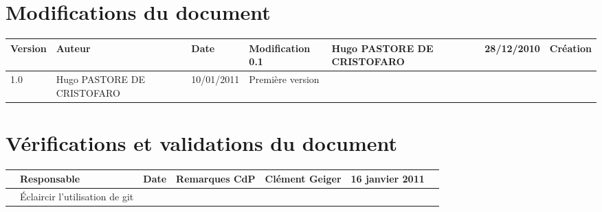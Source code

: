 
\section*{Modifications du document}

\begin{center}
\begin{longtable}{|m{14mm}||m{36mm}|m{36mm}|m{60mm}|}
\hline
Version & Auteur & Date & Modification\endhead \hline
0.1
& %
Hugo PASTORE DE CRISTOFARO
& %
28/12/2010
& %
Création
\\\hline
1.0
& %
Hugo PASTORE DE CRISTOFARO
& %
10/01/2011
& %
Première version
\\\hline
\end{longtable}
\end{center}


\section*{Vérifications et validations du document}

\begin{center}
\begin{longtable}{|m{15mm}|m{36mm}|m{36mm}|m{60mm}|}
\hline
 & Responsable & Date & Remarques\endhead \hline
CdP

& %
Clément Geiger

& %
16 janvier 2011

& %

\\\hline

& %
Éclaircir l'utilisation de git

& %

& %

\\\hline
\end{longtable}
\end{center}

\pagebreak
